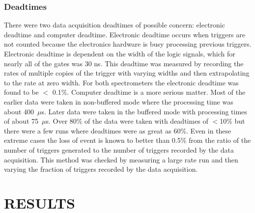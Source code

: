 \documentclass[aps,prl,twocolumn,showpacs,amsmath,amssymb,floats]{revtex4}
\begin{document}
\subsubsection*{Deadtimes}
 
There were two data acquisition deadtimes of possible concern: electronic 
deadtime and computer deadtime.  Electronic deadtime occurs when triggers are 
not counted because the electronics hardware is busy processing previous 
triggers.  Electronic deadtime is dependent on the width of the logic signals, 
which for nearly all of the gates was 30 ns.  This deadtime was measured by 
recording the rates of multiple copies of the trigger with varying widths and 
then extrapolating to the rate at zero width. 
For both spectrometers the electronic deadtime was found to be $<$ 0.1\%.  
Computer deadtime is a more serious matter.  Most of the earlier data were taken 
in non-buffered mode where the processing time was
about 400~$\mu$s.  Later data were taken in the buffered mode with processing 
times of about 75~$\mu$s.  Over 80\% of the data were taken with deadtimes of 
$<$10\% but there were a few runs where deadtimes were as great as 60\%.  Even 
in these extreme cases the loss of event is known to better than 0.5\% from 
the ratio of the number of triggers generated to the number of triggers recorded by the data acquisition. This method was checked by measuring a large rate run
and then varying the fraction of triggers recorded by the data acquisition.


\section*{RESULTS}
\end{document}
